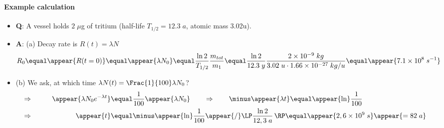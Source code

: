 \begin{frame}
\frametitle{\texorpdfstring{\culine[\sectiontitleulinecolor]{\sectiontitle}}{\sectiontitle} }
\framesubtitle{Example calculation}

\begin{itemize}
	\item \textbf{Q}: A vessel holds $2 \;\mu$g of tritium (half-life $T_{1/2}=12.3\;a$, atomic mass 3.02\;u).

\item \textbf{A}: (a) Decay rate is $R(t)=\lambda N$
\[
R_{0} \equal \appear{R(t=0)} \equal \appear{\lambda N_{0}} \equal \frac{\ln 2}{T_{1 / 2}} \frac{m_{tot}}{m_{1}}  \equal \frac{\ln 2}{12.3 \;y} \frac{2 \times 10^{-9} \;kg}{3.02 \;u \cdot 1.66 \times 10^{-27} \;kg / u}  \equal \appear{7.1 \times 10^{8} \;s^{-1}}
\]
 

\item (b) We ask, at which time $\lambda N(t)=\Frac{1}{100} \lambda N_{0}$? 
$$
\begin{aligned}
 &\Rightarrow \qquad& \appear{\lambda N_{0} e^{-\lambda t}} & \equal \frac{1}{100} \appear{\lambda N_{0}} 
\qquad \Rightarrow \qquad  \minus \appear{\lambda t} \equal \appear{\ln} \frac{1}{100} \\
 &\Rightarrow \qquad&  \appear{t}& \equal  \minus \appear{\ln} \frac{1}{100} \appear{/} \LP \frac{\ln 2}{12,3 \;a} \,\RP \equal \appear{2,6 \times 10^{9} \;s}\appear{=82 \;a}
\end{aligned}
$$

\end{itemize}


\endofslide 
\end{frame}

